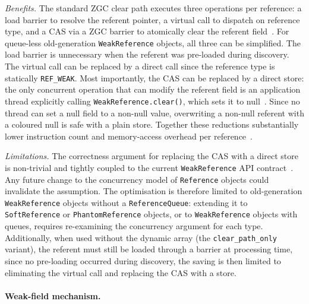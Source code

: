 \emph{Benefits.} The standard \ac{ZGC} clear path executes three operations per reference: a load barrier to resolve the referent pointer, a virtual call to dispatch on reference type, and a \ac{CAS} via a \ac{ZGC} barrier to atomically clear the referent field~\cite{openjdk-zreferenceprocessor-cpp,openjdk-zbarrier-cpp}. For queue-less old-generation \texttt{WeakReference} objects, all three can be simplified. The load barrier is unnecessary when the referent was pre-loaded during discovery. The virtual call can be replaced by a direct call since the reference type is statically \texttt{REF\_WEAK}. Most importantly, the \ac{CAS} can be replaced by a direct store: the only concurrent operation that can modify the referent field is an application thread explicitly calling \texttt{WeakReference.clear()}, which sets it to null~\cite{openjdk-reference-java}. Since no thread can set a null field to a non-null value, overwriting a non-null referent with a coloured null is safe with a plain store. Together these reductions substantially lower instruction count and memory-access overhead per reference~\cite{openjdk-zbarrier-cpp,openjdk-zreferenceprocessor-cpp}.

\emph{Limitations.} The correctness argument for replacing the \ac{CAS} with a direct store is non-trivial and tightly coupled to the current \texttt{WeakReference} \ac{API} contract~\cite{openjdk-reference-java,openjdk-zbarrier-cpp}. Any future change to the concurrency model of \texttt{Reference} objects could invalidate the assumption. The optimisation is therefore limited to old-generation \texttt{WeakReference} objects without a \texttt{ReferenceQueue}: extending it to \texttt{SoftReference} or \texttt{PhantomReference} objects, or to \texttt{WeakReference} objects with queues, requires re-examining the concurrency argument for each type. Additionally, when used without the dynamic array (the \texttt{clear\_path\_only} variant), the referent must still be loaded through a barrier at processing time, since no pre-loading occurred during discovery, the saving is then limited to eliminating the virtual call and replacing the \ac{CAS} with a store.

\paragraph{Weak-field mechanism.}

